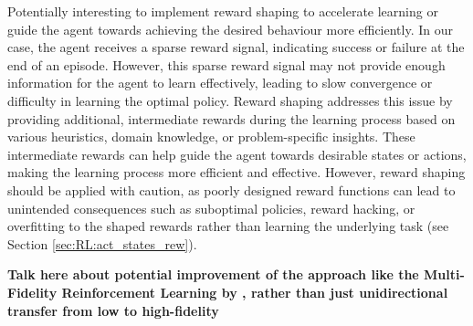 Potentially interesting to implement reward shaping to accelerate learning or guide the agent towards achieving the desired behaviour more efficiently. In our case, the agent receives a sparse reward signal, indicating success or failure at the end of an episode. However, this sparse reward signal may not provide enough information for the agent to learn effectively, leading to slow convergence or difficulty in learning the optimal policy. Reward shaping addresses this issue by providing additional, intermediate rewards during the learning process based on various heuristics, domain knowledge, or problem-specific insights. These intermediate rewards can help guide the agent towards desirable states or actions, making the learning process more efficient and effective. However, reward shaping should be applied with caution, as poorly designed reward functions can lead to unintended consequences such as suboptimal policies, reward hacking, or overfitting to the shaped rewards rather than learning the underlying task (see Section \ref{sec:RL:act_states_rew}).

\textbf{Talk here about potential improvement of the approach like the Multi-Fidelity Reinforcement Learning by \citet{cutler2014reinforcement}, rather than just unidirectional transfer from low to high-fidelity}